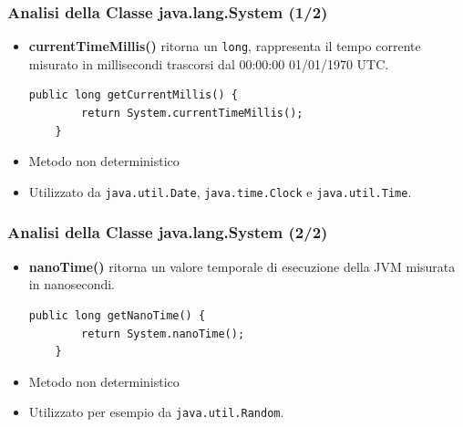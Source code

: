 \documentclass[]{beamer}
\begin{document}
\begin{frame}[fragile]
\frametitle{Analisi della Classe java.lang.System (1/2)}
\begin{block}{}
	\begin{itemize}
		\item \textbf{currentTimeMillis()} ritorna un \lstinline|long|, rappresenta il tempo corrente misurato in millisecondi trascorsi dal 00:00:00 01/01/1970 UTC.
		\begin{lstlisting}[breaklines=true]
	public long getCurrentMillis() {
		return System.currentTimeMillis();
	}
		\end{lstlisting}
	\end{itemize}
\end{block}
\begin{itemize}
	\item Metodo non deterministico
	\item Utilizzato da \lstinline|java.util.Date|, \lstinline|java.time.Clock| e \lstinline|java.util.Time|.
\end{itemize}
\end{frame}

\begin{frame}[fragile]
\frametitle{Analisi della Classe java.lang.System (2/2)}
\begin{block}{}
	\begin{itemize}
		\item \textbf{nanoTime()} ritorna un valore temporale di esecuzione della JVM misurata in nanosecondi.
		\begin{lstlisting}[breaklines=true]
	public long getNanoTime() {
		return System.nanoTime();
	}
		\end{lstlisting}
	\end{itemize}
\end{block}
\begin{itemize}
	\item Metodo non deterministico
	\item Utilizzato per esempio da \lstinline|java.util.Random|.
\end{itemize}
\end{frame}
\end{document}
